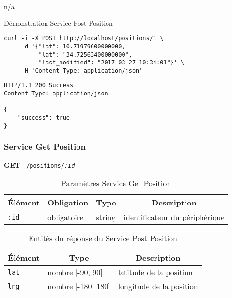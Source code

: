 n/a

\begin{listing}
    \caption*{Démonstration Service Post Position}
    \begin{verbatim}
curl -i -X POST http://localhost/positions/1 \
     -d '{"lat": 10.71979600000000,
          "lat": "34.72563400000000",
          "last_modified": "2017-03-27 10:34:01"}' \
     -H 'Content-Type: application/json'
\end{verbatim}
\begin{verbatim}
HTTP/1.1 200 Success
Content-Type: application/json

{
    "success": true
}
\end{verbatim}
\end{listing}

\subsubsection{Service Get Position}
\label{appendix:sprint1-position-get-doc}

\textbf{GET} \ \texttt{/positions/\textit{:id}}

\begin{table}[htbp]
    \centering
    \caption*{Paramètres Service Get Position}
    \begin{tabular}{llll}
        \toprule
        \multicolumn{1}{c}{\textbf{Élément}} &
        \multicolumn{1}{c}{\textbf{Obligation}} &
        \multicolumn{1}{c}{\textbf{Type}} &
        \multicolumn{1}{c}{\textbf{Description}} \\
        \midrule
        \verb|:id| & obligatoire & string & identificateur du périphérique \\
        \bottomrule
    \end{tabular}
\end{table}

\begin{table}[htbp]
    \centering
    \caption*{Entités du réponse du Service Post Position}
    \begin{tabular}{lll}
        \toprule
        \multicolumn{1}{c}{\textbf{Élément}} &
        \multicolumn{1}{c}{\textbf{Type}} &
        \multicolumn{1}{c}{\textbf{Description}} \\
        \midrule
        \verb|lat| & nombre [-90, 90] & latitude de la position \\
        \verb|lng| & nombre [-180, 180] & longitude de la position \\
        \bottomrule
    \end{tabular}
\end{table}

